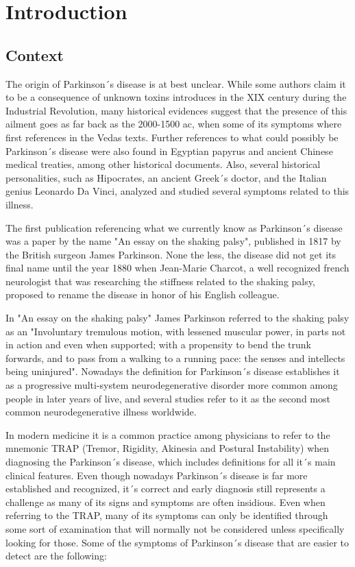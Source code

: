 \documentclass[12pt, a4paper]{article}
\begin{document}
	\clearpage
		
	\section{Introduction}
	
	\subsection{Context}
	
	The origin of Parkinson´s disease is at best unclear. While some authors claim it to be a consequence of unknown toxins introduces in the XIX century during the Industrial Revolution, many historical evidences suggest that the presence of this ailment goes as far back as the 2000-1500 ac, when some of its symptoms where first references in the Vedas texts. Further references to what could possibly be Parkinson´s disease were also found in Egyptian papyrus and ancient Chinese medical treaties, among other historical documents. Also, several historical personalities, such as Hipocrates, an ancient Greek´s doctor, and the Italian genius Leonardo Da Vinci, analyzed and studied several symptoms related to this illness.
	
	The first publication referencing what we currently know as Parkinson´s disease was a paper by the name "An essay on the shaking palsy", published in 1817 by the British surgeon James Parkinson. None the less, the disease did not get its final name until the year 1880 when Jean-Marie Charcot, a well recognized french neurologist that was researching the stiffness related to the shaking palsy, proposed to rename the disease in honor of his English colleague.\cite{parkinsonhistoria}
		
	In "An essay on the shaking palsy" James Parkinson referred to the shaking palsy as an "Involuntary tremulous motion, with lessened muscular power, in parts not in action and even when supported; with a propensity to bend the trunk forwards, and to pass from a walking to a running pace: the senses and intellects being uninjured"\cite{parkinson2002essay}. Nowadays the definition for Parkinson´s disease establishes it as a progressive multi-system neurodegenerative disorder more common among people in later years of live, and several studies refer to it as the second most common neurodegenerative illness worldwide.\cite{sveinbjornsdottir2016clinical}
	
	In modern medicine it is a common practice among physicians to refer to the mnemonic TRAP (Tremor, Rigidity, Akinesia and Postural Instability) when diagnosing the Parkinson´s disease, which includes definitions for all it´s main clinical features. Even though nowadays Parkinson´s disease is far more established and recognized, it´s correct and early diagnosis still represents a challenge as many of its signs and symptoms are often insidious. Even when referring to the TRAP, many of its symptoms can only be identified through some sort of examination that will normally not be considered unless specifically looking for those. Some of the symptoms of Parkinson´s disease that are easier to detect are the following:\cite{frank2006approach}
	
\end{document}
